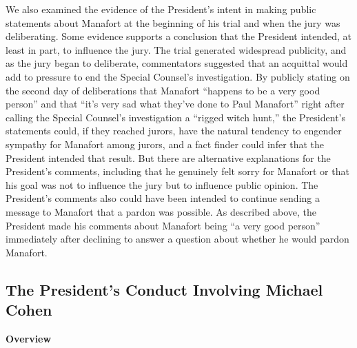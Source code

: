 We also examined the evidence of the President's intent in making public statements about Manafort at the beginning of his trial and when the jury was deliberating.
Some evidence supports a conclusion that the President intended, at least in part, to influence the jury.
The trial generated widespread publicity, and as the jury began to deliberate, commentators suggested that an acquittal would add to pressure to end the Special Counsel's investigation.
By publicly stating on the second day of deliberations that Manafort ``happens to be a very good person'' and that ``it's very sad what they've done to Paul Manafort'' right after calling the Special Counsel's investigation a ``rigged witch hunt,'' the President's statements could, if they reached jurors, have the natural tendency to engender sympathy for Manafort among jurors, and a fact finder could infer that the President intended that result.
But there are alternative explanations for the President's comments, including that he genuinely felt sorry for Manafort or that his goal was not to influence the jury but to influence public opinion.
The President's comments also could have been intended to continue sending a message to Manafort that a pardon was possible.
As described above, the President made his comments about Manafort being ``a very good person'' immediately after declining to answer a question about whether he would pardon Manafort.


\subsection{The President's Conduct Involving Michael Cohen}

\begin{center}
\textbf{Overview}
\end{center}

